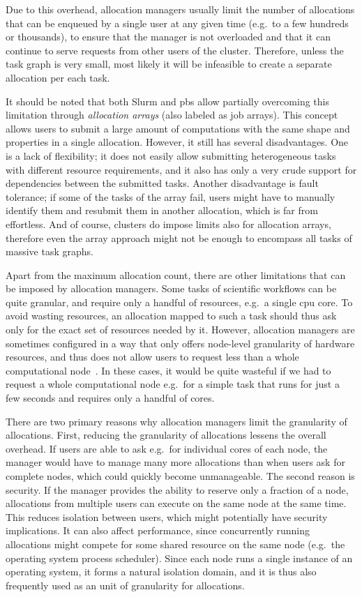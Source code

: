 Due to this overhead, allocation managers usually limit the number of allocations that can be
enqueued by a single user at any given time (e.g.\ to a few hundreds or thousands), to ensure that
the manager is not overloaded and that it can continue to serve requests from other users of the
cluster. Therefore, unless the task graph is very small, most likely it will be infeasible to
create a separate allocation per each task.

It should be noted that both Slurm and \gls{pbs} allow partially overcoming this
limitation through \emph{allocation arrays} (also labeled as job arrays). This concept allows users to submit a large amount
of computations with the same shape and properties in a single allocation. However, it still has
several disadvantages. One is a lack of flexibility; it does not easily allow submitting
heterogeneous tasks with different resource requirements, and it also has only a very crude support
for dependencies between the submitted tasks. Another disadvantage is fault tolerance; if some of
the tasks of the array fail, users might have to manually identify them and resubmit them in
another allocation, which is far from effortless. And of course, clusters do impose limits also for
allocation arrays, therefore even the array approach might not be enough to encompass all tasks of
massive task graphs.

Apart from the maximum allocation count, there are other limitations that can be imposed by
allocation managers. Some tasks of scientific workflows can be quite granular, and require only a
handful of resources, e.g.\ a single \gls{cpu} core. To avoid wasting resources,
an allocation mapped to such a task should thus ask only for the exact set of resources needed by
it. However, allocation managers are sometimes configured in a way that only offers node-level
granularity of hardware resources, and thus does not allow users to request less than a whole
computational node~\cite{it4i_node_scheduling_policy}. In these cases, it would be quite wasteful if we had
to request a whole computational node e.g.\ for a simple task that runs for just a few seconds and
requires only a handful of cores.

There are two primary reasons why allocation managers limit the granularity of allocations. First,
reducing the granularity of allocations lessens the overall overhead. If users are able to ask
e.g.\ for individual cores of each node, the manager would have to manage many more allocations
than when users ask for complete nodes, which could quickly become unmanageable. The second reason
is security. If the manager provides the ability to reserve only a fraction of a node, allocations
from multiple users can execute on the same node at the same time. This reduces isolation between
users, which might potentially have security implications. It can also affect performance, since
concurrently running allocations might compete for some shared resource on the same node (e.g.\ the
operating system process scheduler). Since each node runs a single instance of an operating system,
it forms a natural isolation domain, and it is thus also frequently used as an unit of granularity
for allocations.

